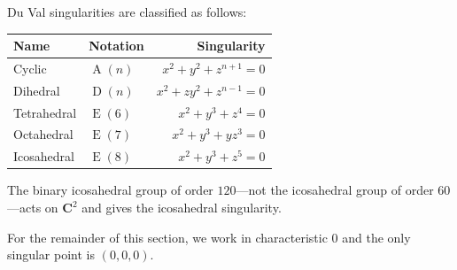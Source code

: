 \documentclass [11 pt, oneside] {article}
\begin{document}
Du Val singularities are classified as follows:
\begin{center}
	\begin{tabular}{llr}
		Name		& Notation	& Singularity\\
		\midrule
		Cyclic		& $\operatorname{A}(n)$	& $x^2+y^2+z^{n+1}=0$\\
		Dihedral		& $\operatorname{D}(n)$& $x^2+zy^2+z^{n-1}=0$\\
		Tetrahedral	& $\operatorname{E}(6)$	& $x^2+y^3+z^4=0$\\
		Octahedral	& $\operatorname{E}(7)$	& $x^2+y^3+yz^3=0$\\
		Icosahedral	& $\operatorname{E}(8)$	& $x^2+y^3+z^5=0$
	\end{tabular}
\end{center}

The binary icosahedral group of order $120$---not the icosahedral group of order $60$---acts on $\mathbf{C}^2$ and gives the icosahedral singularity. 
\begin{remark}
	For the remainder of this section, we work in characteristic $0$ and the only singular point is $(0,0,0)$.
\end{remark}
\end{document}
